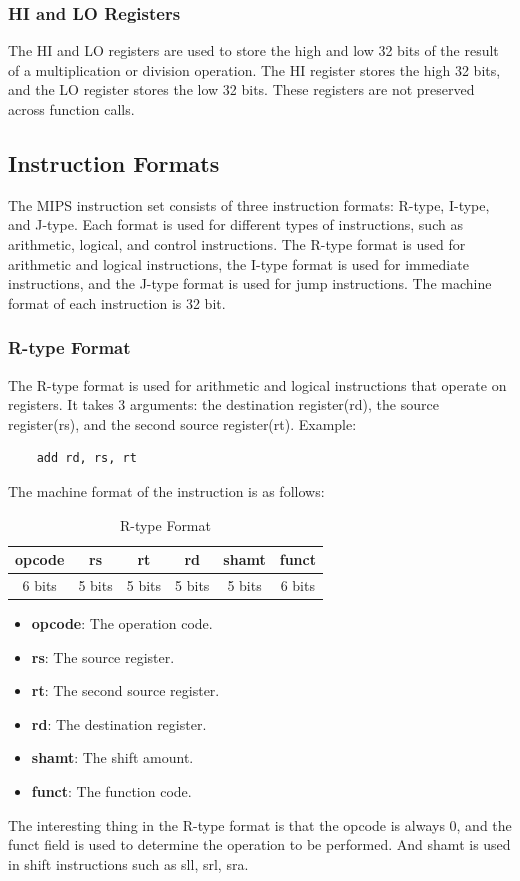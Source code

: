 \subsubsection{HI and LO Registers}
The HI and LO registers are used to store the high and low 32 bits of the result of a multiplication or division operation. The HI register stores the high 32 bits, and the LO register stores the low 32 bits. These registers are not preserved across function calls\cite{patterson1994computer}.

\subsection{Instruction Formats}
The MIPS instruction set consists of three instruction formats: R-type, I-type, and J-type. Each format is used for different types of instructions, such as arithmetic, logical, and control instructions. The R-type format is used for arithmetic and logical instructions, the I-type format is used for immediate instructions, and the J-type format is used for jump instructions. The machine format of each instruction is 32 bit\cite{patterson1994computer}.


\subsubsection{R-type Format}
The R-type format is used for arithmetic and logical instructions that operate on registers. It takes 3 arguments: the destination register(rd), the source register(rs), and the second source register(rt). Example:
\begin{verbatim}
    add rd, rs, rt
\end{verbatim}

The machine format of the instruction is as follows:
\begin{table}[H]
    \centering
    \begin{tabular}{|c|c|c|c|c|c|}
    \hline
    \textbf{opcode} & \textbf{rs} & \textbf{rt} & \textbf{rd} & \textbf{shamt} & \textbf{funct} \\ \hline
    6 bits         & 5 bits     & 5 bits     & 5 bits     & 5 bits        & 6 bits        \\ \hline
    \end{tabular}
    \caption{R-type Format}
    \label{tab:r_type_format}
\end{table}
\begin{itemize}
    \item \textbf{opcode}: The operation code.
    \item \textbf{rs}: The source register.
    \item \textbf{rt}: The second source register.
    \item \textbf{rd}: The destination register.
    \item \textbf{shamt}: The shift amount.
    \item \textbf{funct}: The function code.
\end{itemize}
The interesting thing in the R-type format is that the opcode is always 0, and the funct field is used to determine the operation to be performed\cite{patterson1994computer}. And shamt is used in shift instructions such as sll, srl, sra.

